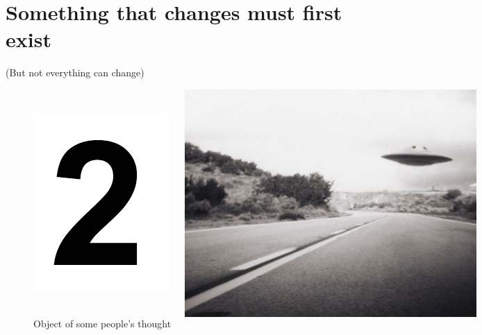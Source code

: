 \documentclass[xcolor=dvipsnames]{beamer}
\begin{document}
\section{Something that changes must first exist}


\begin{frame}{(But not everything can change)}
\begin{figure}
  \centering
  \begin{columns}
    \centering
    \caption {Object of thought (abstract)}
    \includegraphics[width=0.99\textwidth]{number}
    \centering
    \caption {Object of some people's thought}
    \includegraphics[width=0.99\textwidth]{ufo}

\end{columns}
\end{figure}
\end{frame}
\end{document}
